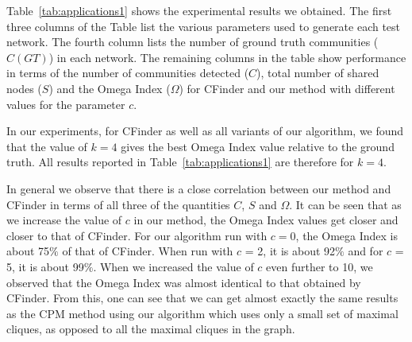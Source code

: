 


Table~\ref{tab:applications1} shows the experimental results we obtained.
The first three columns of the Table list the various parameters used to generate each test network. The fourth column lists the number of ground truth communities ($C(GT)$) in each network.  The remaining columns in the table show performance 
in terms of the number of communities detected ($C$), 
total number of shared nodes ($S$) and the Omega Index ($\Omega$) for 
CFinder and our method with different values for the parameter $c$.

In our experiments, for CFinder as well as all variants of our algorithm, 
we found that the value of $k=4$ gives the best Omega Index value relative 
to the ground truth. All results reported in Table~\ref{tab:applications1} are therefore
for $k=4$.

In general we observe that there is a close correlation between our method and CFinder
in terms of all three of the quantities $C$, $S$ and $\Omega$. It can be seen that as we increase the value of $c$ in our method, the Omega Index values get closer and closer to that of CFinder. For our algorithm run with $c=0$, the Omega Index is about 75$\%$ of that of CFinder. When run with $c$ = 2, it is about 92$\%$ and for $c$ = 5, it is about 99$\%$. When we increased the value of $c$ even further to 10, we observed that the Omega Index was almost identical to that obtained by CFinder. From this, one can see that we can get almost exactly the same results as the CPM method using our algorithm which uses only a small set of 
maximal cliques, as opposed to all the maximal cliques in the graph.



